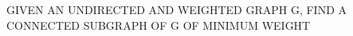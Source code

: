 \documentclass[preview]{standalone}
\begin{document}
\begin{center}
GIVEN AN UNDIRECTED AND WEIGHTED GRAPH G, FIND A CONNECTED SUBGRAPH OF G OF MINIMUM WEIGHT
\end{center}
\end{document}
